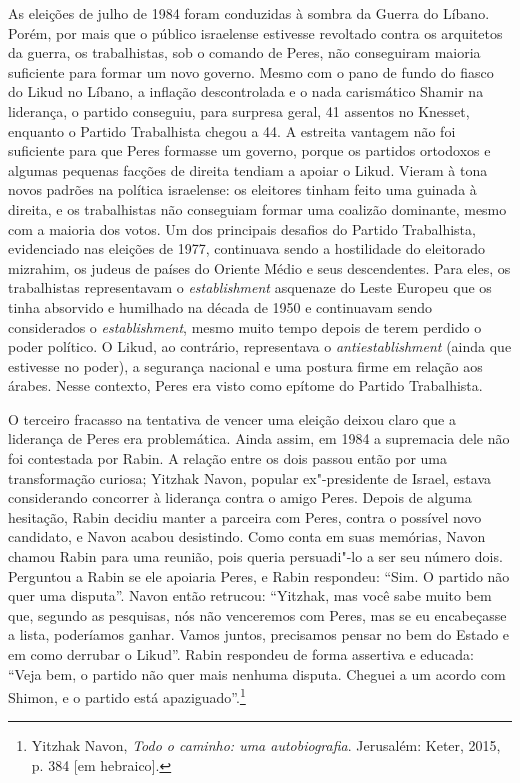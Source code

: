 As eleições de julho de 1984 foram conduzidas à sombra da Guerra do
Líbano. Porém, por mais que o público israelense estivesse revoltado
contra os arquitetos da guerra, os trabalhistas, sob o comando de Peres,
não conseguiram maioria suficiente para formar um novo governo. Mesmo
com o pano de fundo do fiasco do Likud no Líbano, a inflação
descontrolada e o nada carismático Shamir na liderança, o partido
conseguiu, para surpresa geral, 41 assentos no Knesset,
enquanto o Partido Trabalhista chegou a 44. A estreita
vantagem não foi suficiente para que Peres formasse um governo, porque
os partidos ortodoxos e algumas pequenas facções de direita tendiam a
apoiar o Likud. Vieram à tona novos padrões na política israelense: os
eleitores tinham feito uma guinada à direita, e os trabalhistas não
conseguiam formar uma coalizão dominante, mesmo com a maioria dos votos.
Um dos principais desafios do Partido Trabalhista, evidenciado nas
eleições de 1977, continuava sendo a hostilidade do eleitorado
mizrahim, os judeus de países do Oriente Médio e seus descendentes. Para
eles, os trabalhistas representavam o \emph{establishment} asquenaze do
Leste Europeu que os tinha absorvido e humilhado na década de 1950 e
continuavam sendo considerados o \emph{establishment}, mesmo muito tempo depois
de terem perdido o poder político. O Likud, ao contrário, representava o
\emph{antiestablishment} (ainda que estivesse no poder), a segurança nacional e uma
postura firme em relação aos árabes. Nesse contexto, Peres era visto
como epítome do Partido Trabalhista.

O terceiro fracasso na tentativa de vencer uma eleição deixou claro que
a liderança de Peres era problemática. Ainda assim, em 1984 a supremacia
dele não foi contestada por Rabin. A relação entre os dois passou então
por uma transformação curiosa; Yitzhak Navon, popular ex"-presidente de
Israel, estava considerando concorrer à liderança contra o amigo Peres.
Depois de alguma hesitação, Rabin decidiu manter a parceira com Peres,
contra o possível novo candidato, e Navon acabou desistindo. Como conta
em suas memórias, Navon chamou Rabin para uma reunião, pois queria
persuadi"-lo a ser seu número dois. Perguntou a Rabin se ele apoiaria
Peres, e Rabin respondeu: ``Sim. O partido não quer uma disputa''. Navon
então retrucou: ``Yitzhak, mas você sabe muito bem que, segundo as
pesquisas, nós não venceremos com Peres, mas se eu encabeçasse a lista,
poderíamos ganhar. Vamos juntos, precisamos pensar no bem do Estado e em
como derrubar o Likud''. Rabin respondeu de forma assertiva e educada:
``Veja bem, o partido não quer mais nenhuma disputa. Cheguei a um acordo
com Shimon, e o partido está apaziguado''.\footnote{Yitzhak Navon,
  \emph{Todo o caminho: uma autobiografia}. Jerusalém: Keter, 2015, p. 384
  {[}em hebraico{]}.}

